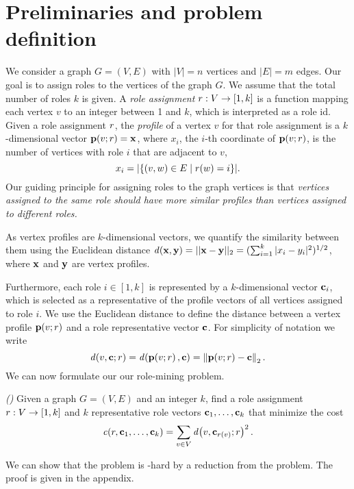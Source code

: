\section{Preliminaries and problem definition}
\label{sec:prel}

We consider a graph $G = (V, E)$ 
with $|V|=n$ vertices and $|E|=m$ edges. 
Our goal is to assign roles to the vertices of the graph $G$.
We assume that the total number of roles $k$ is given.
A \emph{role assignment} 
${r}:{V} \to {[1, k]}$ is a function mapping each vertex $v$ to an integer between 1 and $k$, 
which is interpreted as a role id. 
Given a role assignment $r$, 
the \emph{profile} of a vertex $v$ for that role assignment 
is a $k$-dimensional vector $\prof{v; \role} = \vect{x}$, 
where $x_i$, the $i$-th coordinate of $\prof{v; \role}$, 
is the number of vertices with role $i$ that are adjacent to $v$,
\[
	x_i = {\left|\left\{(v, w) \in E \mid r(w) = i\right\}\right|}.
\]
Our guiding principle for assigning roles to the graph vertices is that
\emph{vertices assigned to the same role should have more similar
profiles than vertices assigned to different roles.}

As vertex profiles are $k$-dimensional vectors, 
we quantify the similarity between them using the Euclidean distance 
$\dist{\vect{x},\vect{y}} = || \vect{x}-\vect{y} ||_2 = 
(\sum_{i=1}^k |x_i-y_i|^2)^{1/2}$, 
where $\mathbf{x}$ and $\mathbf{y}$ are vertex profiles.

Furthermore, each role $i\in[1,k]$ is represented by a $k$-dimensional vector $\mathbf{c}_i$, 
which is selected as a representative of the profile vectors of all vertices assigned to role $i$.
We use the Euclidean distance to define the distance between 
a vertex profile $\prof{v; \role}$ 
and a role representative vector $\mathbf{c}$.
For simplicity of notation we write 
\[
\dist{v, \centroid; \role} = 
\dist{\prof{v; \role},\centroid} = 
\norm{\prof{v; \role} - \centroid}_2.
\]
We can now formulate our our role-mining problem.

\begin{problem}
\label{problem:role-mining}
\emph{(\prbrm)}
Given a graph $G = (V, E)$ and an integer $k$, 
find a role assignment ${r}:{V} \to {[1, k]}$ and 
$k$ representative role vectors $\mathbf{c}_1, \ldots, \mathbf{c}_k$
that minimize the cost
\[
\cost{\role, \centroid_1, \ldots, \centroid_k} = 
\sum_{v \in V} \dist{v, \centroid_{\role(v)}; \role}^2.
\]
\end{problem}

We can show that the \prbrm problem is  \np-hard
by a reduction from the \tmatch problem.
The proof is given in the appendix.

